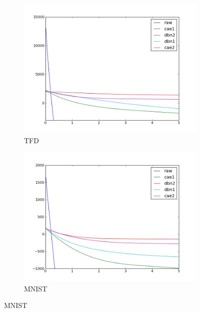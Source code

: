 \begin{figure}
\begin{subfigure}{.45\textwidth}
\includegraphics[width=1.\textwidth]{article3/images/tfdfold1_degree6.png}
\caption{TFD}
\end{subfigure}
\begin{subfigure}{.45\textwidth}
\includegraphics[width=1.\textwidth]{article3/images/convexball_mnist28_degree6.png}
\caption{MNIST}
\end{subfigure}


\end{figure}
